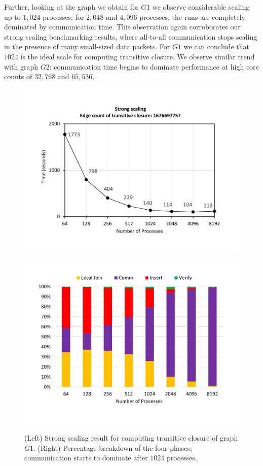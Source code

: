 Further, looking at the graph we obtain for $G1$ we observe considerable scaling up to $1,024$ processes; for $2,048$ and $4,096$ processes, the runs are completely dominated by communication time. This observation again corroborates our strong scaling benchmarking results, where all-to-all communication stops scaling in the presence of many small-sized data packets. For $G1$ we can conclude that $1024$ is the ideal scale for computing transitive closure.
We observe similar trend with graph $G2$: communication time begins to dominate performance at high core counts of $32,\!768$ and $65,\!536$. %



\begin{figure}[t]
	{\includegraphics[width=.50\textwidth,  trim={0cm 0cm 0cm 0cm, 
			clip}]{results/TC_1_final.pdf}}\hfill%
	{\includegraphics[width=.50\textwidth,  trim={0cm 0cm 0cm 0cm,
			clip}]{results/TC_1_break_down_final.pdf}}\hfill%
	\centering
	\caption{(Left) Strong scaling result for computing transitive closure of graph $G1$. (Right) Percentage breakdown of the four phases; communication starts to dominate after $1024$ processes. }
	\label{fig:tc_small}
\end{figure}

